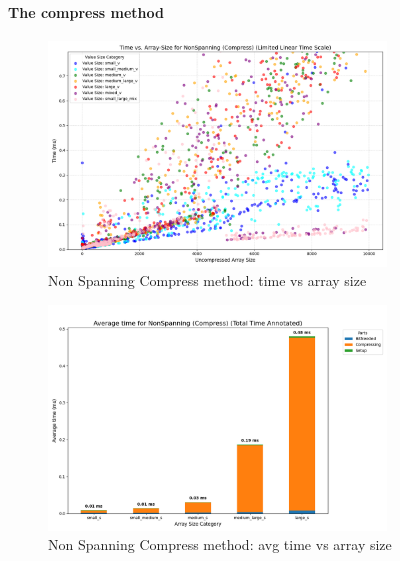 \documentclass[11pt, a4paper]{article}
\begin{document}
	\paragraph{The compress method}
	\begin{figure}[H]%
		\centering
		\includegraphics[width=0.8\textwidth]{Grafics/NonSpanning/NonSpanningCompressTimevsSize.png}
		\caption{Non Spanning Compress method: time vs array size}
		\label{fig:4}
		
	\end{figure}
	\begin{figure}[H]%
		\centering
		\includegraphics[width=0.8\textwidth]{Grafics/NonSpanning/NonSpanningCompressTime.png}
		\caption{Non Spanning Compress method: avg time vs array size}
		\label{fig:5}
	\end{figure}
	
\end{document}

